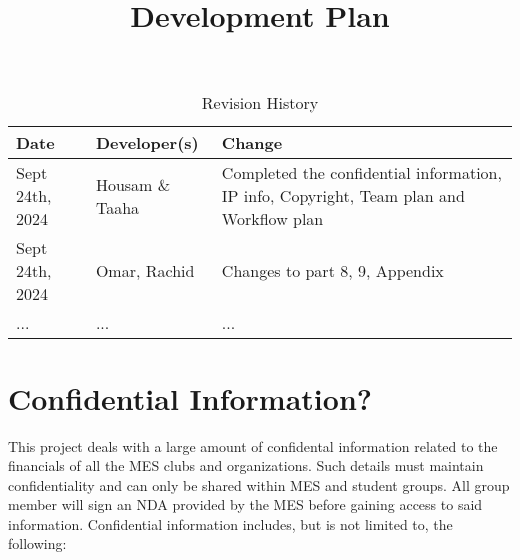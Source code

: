 \documentclass{article}
\title{Development Plan\\\progname}
\author{\authname}
\date{}
\begin{document}
\maketitle

\begin{table}[hp]
\caption{Revision History} \label{TblRevisionHistory}
\begin{tabularx}{\textwidth}{llX}
\toprule
\textbf{Date} & \textbf{Developer(s)} & \textbf{Change}\\
\midrule
Sept 24th, 2024 & Housam \& Taaha & Completed the confidential information, IP info, Copyright, Team plan and Workflow plan \\
Sept 24th, 2024 & Omar, Rachid & Changes to part 8, 9, Appendix\\
... & ... & ...\\
\bottomrule
\end{tabularx}
\end{table}

\newpage{}



\section{Confidential Information?}
This project deals with a large amount of confidental information related to the financials of all the MES clubs and organizations. Such details must maintain confidentiality and can only be shared within MES and student groups. All group member will sign an NDA provided by the MES before gaining access to said information. Confidential information includes, but is not limited to, the following:
\end{document}
